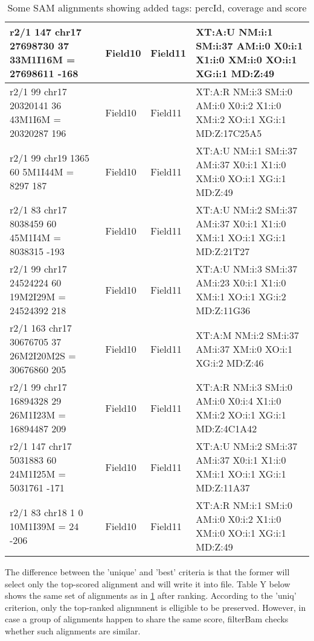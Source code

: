 \documentclass[11pt]{article}
\begin{document}
{\begin{landscape}
  \centering
  \begin{table}
    \begin{tabular}{|l|l|l|l|}
      \hline
      r2/1	147	chr17	27698730	37	33M1I16M	=	27698611	-168	& Field10	& Field11	& XT:A:U	NM:i:1	SM:i:37	AM:i:0	X0:i:1	X1:i:0	XM:i:0	XO:i:1	XG:i:1	MD:Z:49 \\ \hline
      r2/1	99	chr17	20320141	36	43M1I6M	=	20320287	196	& Field10	& Field11	& 	XT:A:R	NM:i:3	SM:i:0	AM:i:0	X0:i:2	X1:i:0	XM:i:2	XO:i:1	XG:i:1	MD:Z:17C25A5 \\ \hline
      r2/1	99	chr19	1365	60	5M1I44M	=	8297	187	& Field10	& Field11	& 	XT:A:U	NM:i:1	SM:i:37	AM:i:37	X0:i:1	X1:i:0	XM:i:0	XO:i:1	XG:i:1	MD:Z:49 \\ \hline
      r2/1	83	chr17	8038459	60	45M1I4M	=	8038315	-193	& Field10	& Field11	& 	XT:A:U	NM:i:2	SM:i:37	AM:i:37	X0:i:1	X1:i:0	XM:i:1	XO:i:1	XG:i:1	MD:Z:21T27 \\ \hline
      r2/1	99	chr17	24524224	60	19M2I29M	=	24524392	218	& Field10	& Field11	& 	XT:A:U	NM:i:3	SM:i:37	AM:i:23	X0:i:1	X1:i:0	XM:i:1	XO:i:1	XG:i:2	MD:Z:11G36 \\ \hline
      r2/1	163	chr17	30676705	37	26M2I20M2S	=	30676860	205	& Field10	& Field11	& 	XT:A:M	NM:i:2	SM:i:37	AM:i:37	XM:i:0	XO:i:1	XG:i:2	MD:Z:46 \\ \hline
      r2/1	99	chr17	16894328	29	26M1I23M	=	16894487	209	& Field10	& Field11	& 	XT:A:R	NM:i:3	SM:i:0	AM:i:0	X0:i:4	X1:i:0	XM:i:2	XO:i:1	XG:i:1	MD:Z:4C1A42 \\ \hline
      r2/1	147	chr17	5031883	60	24M1I25M	=	5031761	-171	& Field10	& Field11	& 	XT:A:U	NM:i:2	SM:i:37	AM:i:37	X0:i:1	X1:i:0	XM:i:1	XO:i:1	XG:i:1	MD:Z:11A37 \\ \hline
      r2/1	83	chr18	1	0	10M1I39M	=	24	-206	& Field10	& Field11	& 	XT:A:R	NM:i:1	SM:i:0	AM:i:0	X0:i:2	X1:i:0	XM:i:0	XO:i:1	XG:i:1	MD:Z:49 \\ \hline
    \end{tabular}
    \caption{Some SAM alignments showing added tags: percId, coverage and score}
    \label{tab:singleReads}
  \end{table}
\end{landscape}

The difference between the 'unique' and 'best' criteria is that the former will select only the top-scored 
alignment and will write it into file. Table Y below shows the same set of alignments as in \ref{tab:singleReads} after ranking. According to the 'uniq' criterion, only the top-ranked alignmnent is elligible to be 
preserved. However, in case a group of alignments happen to share the same score, filterBam checks whether 
such alignments are similar. 

}
\end{document}
